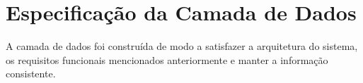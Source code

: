 
\section{Especificação da Camada de Dados}
\label{cap:dados}

A camada de dados foi construída de modo a satisfazer a arquitetura do sistema, os requisitos funcionais mencionados anteriormente e manter a informação consistente.

%
%
%
%
